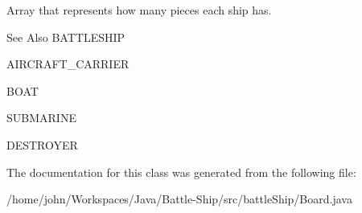 Array that represents how many pieces each ship has. 

\begin{DoxySeeAlso}{See Also}
B\-A\-T\-T\-L\-E\-S\-H\-I\-P 

A\-I\-R\-C\-R\-A\-F\-T\-\_\-\-C\-A\-R\-R\-I\-E\-R 

B\-O\-A\-T 

S\-U\-B\-M\-A\-R\-I\-N\-E 

D\-E\-S\-T\-R\-O\-Y\-E\-R 
\end{DoxySeeAlso}


The documentation for this class was generated from the following file\-:\begin{DoxyCompactItemize}
\item 
/home/john/\-Workspaces/\-Java/\-Battle-\/\-Ship/src/battle\-Ship/Board.\-java\end{DoxyCompactItemize}
